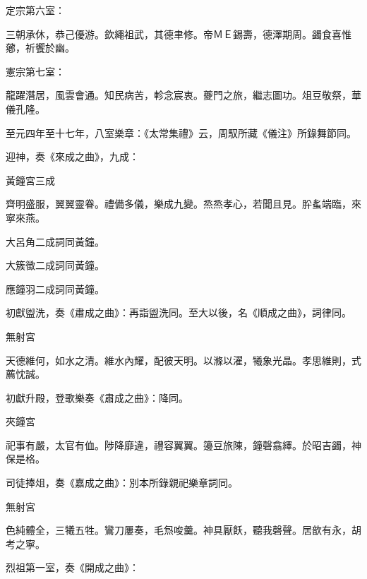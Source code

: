 \begin{pinyinscope}
 定宗第六室：



 三朝承休，恭己優游。欽繩祖武，其德聿修。帝ＭＥ錫壽，德澤期周。蠲食喜惟薌，祈饗於幽。



 憲宗第七室：



 龍躍潛居，風雲會通。知民病苦，軫念宸衷。夔門之旅，繼志圖功。俎豆敬祭，華儀孔隆。



 至元四年至十七年，八室樂章：《太常集禮》云，周馭所藏《儀注》所錄舞節同。



 迎神，奏《來成之曲》，九成：



 黃鐘宮三成



 齊明盛服，翼翼靈眷。禮備多儀，樂成九變。烝烝孝心，若聞且見。肸蚃端臨，來寧來燕。



 大呂角二成詞同黃鐘。



 大簇徵二成詞同黃鐘。



 應鐘羽二成詞同黃鐘。



 初獻盥洗，奏《肅成之曲》：再詣盥洗同。至大以後，名《順成之曲》，詞律同。



 無射宮



 天德維何，如水之清。維水內耀，配彼天明。以滌以濯，犧象光晶。孝思維則，式薦忱誠。



 初獻升殿，登歌樂奏《肅成之曲》：降同。



 夾鐘宮



 祀事有嚴，太官有侐。陟降靡違，禮容翼翼。籩豆旅陳，鐘磬翕繹。於昭吉蠲，神保是格。



 司徒捧俎，奏《嘉成之曲》：別本所錄親祀樂章詞同。



 無射宮



 色純體全，三犧五牲。鸞刀屢奏，毛炰唆羹。神具厭飫，聽我磬聲。居歆有永，胡考之寧。



 烈祖第一室，奏《開成之曲》：




\end{pinyinscope}
